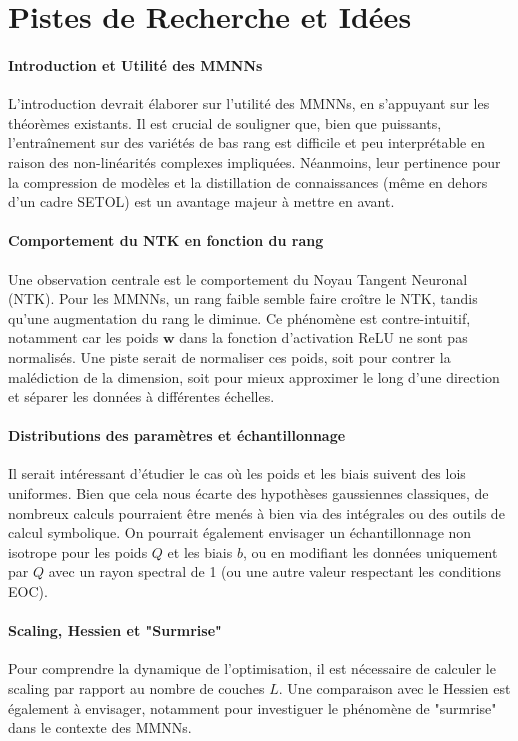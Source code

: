 \section*{Pistes de Recherche et Idées}

\paragraph{Introduction et Utilité des MMNNs}
L'introduction devrait élaborer sur l'utilité des MMNNs, en s'appuyant sur les théorèmes existants. Il est crucial de souligner que, bien que puissants, l'entraînement sur des variétés de bas rang est difficile et peu interprétable en raison des non-linéarités complexes impliquées. Néanmoins, leur pertinence pour la compression de modèles et la distillation de connaissances (même en dehors d'un cadre SETOL) est un avantage majeur à mettre en avant.

\paragraph{Comportement du NTK en fonction du rang}
Une observation centrale est le comportement du Noyau Tangent Neuronal (NTK). Pour les MMNNs, un rang faible semble faire croître le NTK, tandis qu'une augmentation du rang le diminue. Ce phénomène est contre-intuitif, notamment car les poids $\bm{w}$ dans la fonction d'activation ReLU ne sont pas normalisés. Une piste serait de normaliser ces poids, soit pour contrer la malédiction de la dimension, soit pour mieux approximer le long d'une direction et séparer les données à différentes échelles.

\paragraph{Distributions des paramètres et échantillonnage}
Il serait intéressant d'étudier le cas où les poids et les biais suivent des lois uniformes. Bien que cela nous écarte des hypothèses gaussiennes classiques, de nombreux calculs pourraient être menés à bien via des intégrales ou des outils de calcul symbolique. On pourrait également envisager un échantillonnage non isotrope pour les poids $Q$ et les biais $b$, ou en modifiant les données uniquement par $Q$ avec un rayon spectral de 1 (ou une autre valeur respectant les conditions EOC).

\paragraph{Scaling, Hessien et "Surmrise"}
Pour comprendre la dynamique de l'optimisation, il est nécessaire de calculer le scaling par rapport au nombre de couches $L$. Une comparaison avec le Hessien est également à envisager, notamment pour investiguer le phénomène de "surmrise" dans le contexte des MMNNs.

